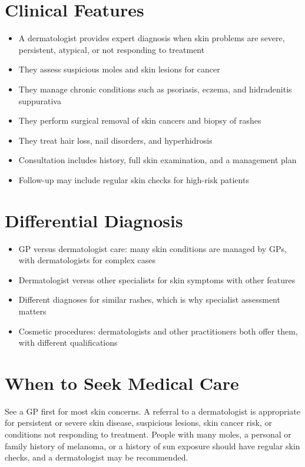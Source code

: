 \section*{Clinical Features}
\begin{itemize}
    \item A dermatologist provides expert diagnosis when skin problems are severe, persistent, atypical, or not responding to treatment
    \item They assess suspicious moles and skin lesions for cancer
    \item They manage chronic conditions such as psoriasis, eczema, and hidradenitis suppurativa
    \item They perform surgical removal of skin cancers and biopsy of rashes
    \item They treat hair loss, nail disorders, and hyperhidrosis
    \item Consultation includes history, full skin examination, and a management plan
    \item Follow-up may include regular skin checks for high-risk patients
\end{itemize}

\section*{Differential Diagnosis}
\begin{itemize}
    \item GP versus dermatologist care: many skin conditions are managed by GPs, with dermatologists for complex cases
    \item Dermatologist versus other specialists for skin symptoms with other features
    \item Different diagnoses for similar rashes, which is why specialist assessment matters
    \item Cosmetic procedures: dermatologists and other practitioners both offer them, with different qualifications
\end{itemize}

\section*{When to Seek Medical Care}
See a GP first for most skin concerns. A referral to a dermatologist is appropriate for persistent or severe skin disease, suspicious lesions, skin cancer risk, or conditions not responding to treatment. People with many moles, a personal or family history of melanoma, or a history of sun exposure should have regular skin checks, and a dermatologist may be recommended.

